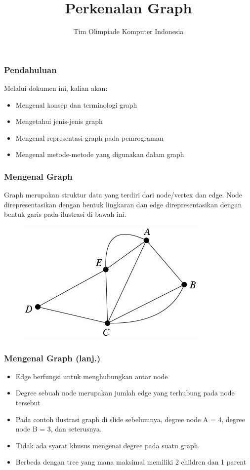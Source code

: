 

\title{Perkenalan Graph}
\author{Tim Olimpiade Komputer Indonesia}
\date{}

\usepackage{verbatim}



\begin{frame}
\titlepage
\end{frame}

\begin{frame}
\frametitle{Pendahuluan}
Melalui dokumen ini, kalian akan:
\begin{itemize}
  \item Mengenal konsep dan terminologi graph
  \item Mengetahui jenis-jenis graph
  \item Mengenal representasi graph pada pemrograman
  \item Mengenal metode-metode yang digunakan dalam graph
\end{itemize}

\end{frame}

\begin{frame}
\frametitle{Mengenal Graph}
Graph merupakan struktur data yang terdiri dari \alert{node/vertex} dan \alert{edge}. Node direpresentasikan dengan bentuk lingkaran dan edge direpresentasikan dengan bentuk garis pada ilustrasi di bawah ini.

\begin{figure}
  \centering
  \includegraphics[width=6 cm]{asset/graph.jpg}
\end{figure}
\end{frame}

\begin{frame}
\frametitle{Mengenal Graph (lanj.)}
\begin{itemize}
  \item Edge berfungsi untuk menghubungkan antar node
  \item \alert{Degree} sebuah node merupakan jumlah edge yang terhubung pada node tersebut
  \item Pada contoh ilustrasi graph di slide sebelumnya, degree node A = 4, degree node B = 3, dan seterusnya.
  \item Tidak ada syarat khusus mengenai degree pada suatu graph.
  \item Berbeda dengan tree yang mana maksimal memiliki 2 children dan 1 parent
\end{itemize}

\end{frame}

